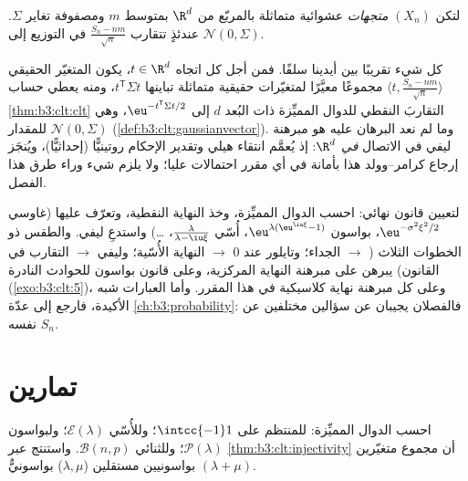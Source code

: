 \begin{theorem}
\label{thm:b3:clt:multiclt}
لتكن $(X_n)$ \emph{متجهات} عشوائية  متماثلة  بالمربّع من $\R^d$ بمتوسط $m$ ومصفوفة تغاير $\Sigma$.
عندئذٍ تتقارب $\frac{S_n - nm}{\sqrt n}$ في التوزيع إلى 
$\mathcal N(0,
\Sigma)$.
\admitted
\end{theorem}

\begin{remark}\label{rem:b3:clt:multiclt}
كل شيء تقريبًا بين أيدينا سلفًا. فمن أجل كل اتجاه $t \in \R^d$،
يكون المتغيّر الحقيقي $\langle t,
\frac{S_n - nm}{\sqrt n}\rangle$ مجموعًا معيَّرًا لمتغيّرات حقيقية
 متماثلة تباينها $t^{\mathsf T}\Sigma t$، ومنه يعطي حساب \cref{thm:b3:clt:clt}
التقاربَ النقطي للدوال المميِّزة ذات البُعد $d$ إلى $\eu^{-t^{\mathsf T}\Sigma t/2}$، وهي
 للمقدار $\mathcal N(0, \Sigma)$ (\cref{def:b3:clt:gaussianvector}). وما لم نعد
البرهان عليه هو مبرهنة ليفي في الاتصال \emph{في $\R^d$}: إذ
يُعمَّم انتقاء هيلي وتقدير الإحكام روتينيًّا (إحداثيًّا)،
ويُنجَز إرجاع كرامر--وولد هذا بأمانة في أي مقرر احتمالات عليا؛
ولا يلزم شيء وراء طرق هذا الفصل.
\end{remark}

\begin{method}\label{met:b3:clt:method}
لتعيين قانون نهائي: احسب الدوال المميِّزة، وخذ النهاية النقطية،
وتعرّف عليها (غاوسي $\eu^{-\sigma^2\xi^2/2}$، بواسون $\eu^{\lambda(\eu^{\iu\xi}-1)}$، أُسّي $\frac{\lambda}
{\lambda - \iu\xi}$،
\dots) واستدعِ ليفي. والطقس ذو الخطوات الثلاث ( $\to$
الجداء؛ وتايلور عند $0$ $\to$ النهاية الأُسّية؛ وليفي $\to$
التقارب في القانون) يبرهن على مبرهنة النهاية المركزية، وعلى
قانون بواسون للحوادث النادرة (\cref{exo:b3:clt:5})، وعلى كل مبرهنة
نهاية كلاسيكية في هذا المقرر. وأما العبارات شبه الأكيدة، فارجع
إلى عدّة \cref{ch:b3:probability}: فالفصلان يجيبان عن سؤالين مختلفين عن
$S_n$ نفسه.
\end{method}

\section{تمارين}

\begin{exercise}[$\star$]\label{exo:b3:clt:1}
احسب الدوال المميِّزة: للمنتظم على $\intcc{-1}1$؛ وللأُسّي
$\mathcal E(\lambda)$؛ ولبواسون $\mathcal P(\lambda)$؛ وللثنائي $\mathcal B(n, p)$. واستنتج عبر
\cref{thm:b3:clt:injectivity} أن مجموع متغيّرين بواسونيين مستقلين ($\lambda, \mu$)
بواسونيٌّ $(\lambda +
\mu)$.
\end{exercise}

